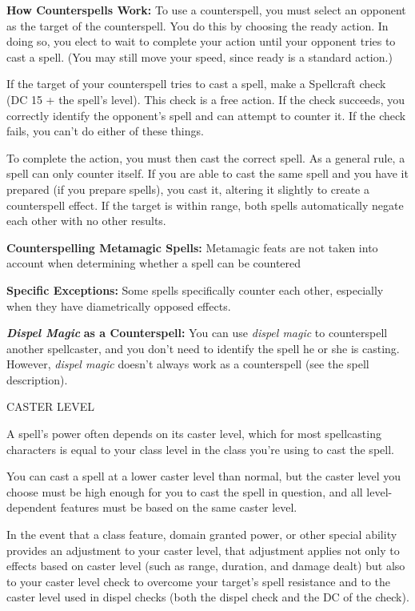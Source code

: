 \documentclass{article}
\begin{document}
\textbf{How Counterspells Work: }To use a counterspell, you must select an opponent 
as the target of the counterspell. You do this by choosing the ready action. In 
doing so, you elect to wait to complete your action until your opponent tries to 
cast a spell. (You may still move your speed, since ready is a standard action.)

If the target of your counterspell tries to cast a spell, make a Spellcraft check 
(DC 15 + the spell's level). This check is a free action. If the check succeeds, 
you correctly identify the opponent's spell and can attempt to counter it. If the 
check fails, you can't do either of these things.

To complete the action, you must then cast the correct spell. As a general rule, 
a spell can only counter itself. If you are able to cast the same spell and you 
have it prepared (if you prepare spells), you cast it, altering it slightly to 
create a counterspell effect. If the target is within range, both spells automatically 
negate each other with no other results.

\textbf{Counterspelling Metamagic Spells:} Metamagic feats are not taken into account 
when determining whether a spell can be countered

\textbf{Specific Exceptions:} Some spells specifically counter each other, especially 
when they have diametrically opposed effects.

\textit{\textbf{Dispel Magic }}\textbf{as a Counterspell:} You can use \textit{dispel 
magic }to counterspell another spellcaster, and you don't need to identify the 
spell he or she is casting. However, \textit{dispel magic }doesn't always work 
as a counterspell (see the spell description).

\vspace{12pt}
CASTER LEVEL

A spell's power often depends on its caster level, which for most spellcasting 
characters is equal to your class level in the class you're using to cast the spell. 

You can cast a spell at a lower caster level than normal, but the caster level 
you choose must be high enough for you to cast the spell in question, and all level-dependent 
features must be based on the same caster level. 

In the event that a class feature, domain granted power, or other special ability 
provides an adjustment to your caster level, that adjustment applies not only to 
effects based on caster level (such as range, duration, and damage dealt) but also 
to your caster level check to overcome your target's spell resistance and to the 
caster level used in dispel checks (both the dispel check and the DC of the check). 
\end{document}
